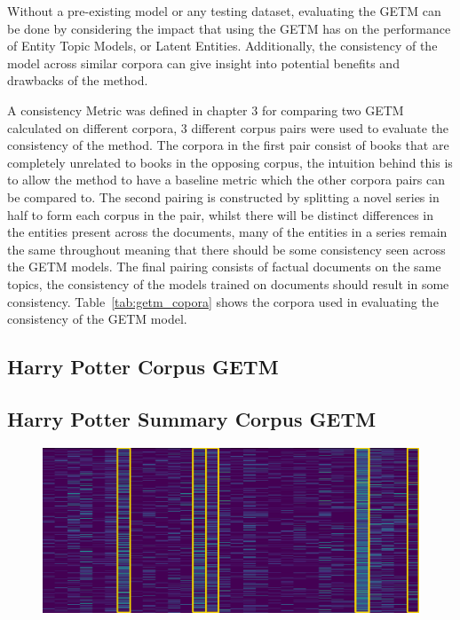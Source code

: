 \documentclass[10pt]{report}
\begin{document}
Without a pre-existing model or any testing dataset, evaluating the GETM can be done by considering the impact that using the GETM has on the performance of Entity Topic Models, or Latent Entities. Additionally, the consistency of the model across similar corpora can give insight into potential benefits and drawbacks of the method.

A consistency Metric was defined in chapter 3 for comparing two GETM calculated on different corpora, 3 different corpus pairs were used to evaluate the consistency of the method. The corpora in the first pair consist of books that are completely unrelated to books in the opposing corpus, the intuition behind this is to allow the method to have a baseline metric which the other corpora pairs can be compared to. The second pairing is constructed by splitting a novel series in half to form each corpus in the pair, whilst there will be distinct differences in the entities present across the documents, many of the entities in a series remain the same throughout meaning that there should be some consistency seen across the GETM models. The final pairing consists of factual documents on the same topics, the consistency of the models trained on documents should result in some consistency. Table~\ref{tab:getm_copora} shows the corpora used in evaluating the consistency of the GETM model.

\clearpage
\subsection{Harry Potter Corpus GETM}

\clearpage
\subsection{Harry Potter Summary Corpus GETM}

\begin{figure}[h!]
  \centering
  \includegraphics[scale=0.35]{hp_getm_summ_vis}
\caption{\label{fig:hp_summ_getm}}
\end{figure}
\end{document}
